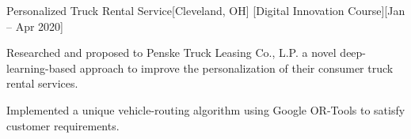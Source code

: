 \begin{ritemize}
{Personalized Truck Rental Service}[Cleveland, OH]
[Digital Innovation Course][Jan -- Apr 2020]
	\item Researched and proposed to Penske Truck Leasing Co., L.P. a novel deep-learning-based approach to improve the personalization of their consumer truck rental services.
	\item Implemented a unique vehicle-routing algorithm using Google OR-Tools to satisfy customer requirements.
\end{ritemize}